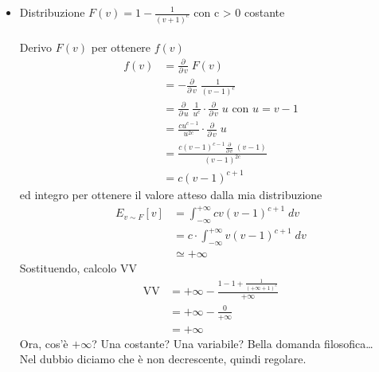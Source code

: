 \documentclass{article}
\begin{document}
\begin{itemize}
                \newpage
                \item Distribuzione $ F(v) = 1 - \frac{1}{(v + 1)^c} $  con c > 0 costante\\
                      \\
                      Derivo $ F(v) $ per ottenere $ f(v) $
                      \[
                        \begin{aligned}
                            f(v) &= \frac{\partial}{\partial\, v}\; F(v) \\
                            &= - \frac{\partial}{\partial\, v}\; \frac{1}{(v - 1)^c} \\
                            &= \frac{\partial}{\partial\, u}\; \frac{1}{u^c} \cdot \frac{\partial}{\partial\, v}\; u \text{ con } u = v - 1 \\
                            &= \frac{cu^{c - 1}}{u^{2c}} \cdot \frac{\partial}{\partial\, v}\; u \\
                            &= \frac{c(v - 1)^{c - 1} \frac{\partial}{\partial\, v}\; (v- 1)}{(v - 1)^{2c}} \\
                            &= c(v - 1)^{c + 1}
                        \end{aligned}    
                      \]
                      ed integro per ottenere il valore atteso dalla mia distribuzione
                      \[
                        \begin{aligned}
                            E_{v \sim F}[v] &= \int_{-\infty}^{+\infty}{cv(v - 1)^{c + 1}\; dv} \\
                            &= c \cdot \int_{-\infty}^{+\infty}{v(v - 1)^{c + 1}\; dv} \\
                            &\simeq +\infty
                        \end{aligned}    
                      \]
                      Sostituendo, calcolo VV
                      \[
                         \begin{aligned}
                             \text{VV} &= +\infty - \frac{1 - 1 + \frac{1}{(+\infty + 1)^c}}{+\infty} \\
                             &= +\infty - \frac{0}{+\infty} \\
                             &= +\infty
                         \end{aligned}   
                      \]
                      Ora, cos'è $ +\infty $? Una costante? Una variabile? Bella domanda filosofica\dots\\
                      Nel dubbio diciamo che è non decrescente, quindi regolare.
            \end{itemize}
        \newpage
\end{document}
